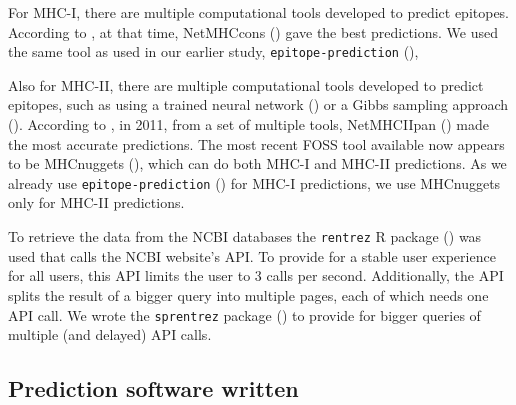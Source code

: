 
For MHC-I, there are multiple computational tools developed 
to predict epitopes. 
According to \cite{lundegaard2011prediction}, at that time,
NetMHCcons (\cite{karosiene2012netmhccons}) gave the best predictions.
We used the same tool as used in our earlier study, \verb;epitope-prediction; (\cite{bianchi2017}),


Also for MHC-II, there are multiple computational tools developed 
to predict epitopes,
such as using a trained neural network (\cite{nielsen2003reliable})
or a Gibbs sampling approach (\cite{nielsen2004improved}).
According to \cite{lundegaard2011prediction}, in 2011,
from a set of multiple tools, 
NetMHCIIpan (\cite{nielsen2008quantitative,karosiene2013netmhciipan})
made the most accurate predictions.
The most recent FOSS tool available now appears
to be MHCnuggets (\cite{shao2020high}), which can do both MHC-I 
and MHC-II predictions. 
As we already use \verb;epitope-prediction; (\cite{bianchi2017}) 
for MHC-I predictions, we use MHCnuggets only for MHC-II predictions.


To retrieve the data from the NCBI databases the
\verb;rentrez; R package (\cite{rentrez}) was used
that calls the NCBI website's API. To provide for a 
stable user experience for all users, 
this API limits the user to 3 calls per second.
Additionally, the API splits the result of a bigger
query into multiple pages, each of which needs one API call.
We wrote the \verb;sprentrez; package (\cite{sprentrez}) to provide for 
bigger queries of multiple (and delayed) API calls.

\subsection{Prediction software written}

